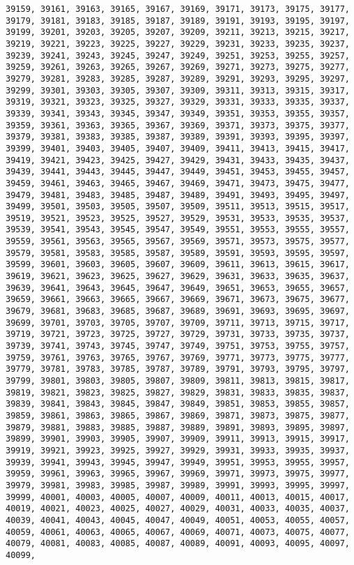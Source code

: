 \documentclass[11pt]{article}
\begin{document}
\begin{Verbatim}[commandchars=\\\{\}]
39159, 39161, 39163, 39165, 39167, 39169, 39171, 39173, 39175, 39177, 39179, 39181, 39183, 39185, 39187, 39189, 39191, 39193, 39195, 39197, 39199, 39201, 39203, 39205, 39207, 39209, 39211, 39213, 39215, 39217, 39219, 39221, 39223, 39225, 39227, 39229, 39231, 39233, 39235, 39237, 39239, 39241, 39243, 39245, 39247, 39249, 39251, 39253, 39255, 39257, 39259, 39261, 39263, 39265, 39267, 39269, 39271, 39273, 39275, 39277, 39279, 39281, 39283, 39285, 39287, 39289, 39291, 39293, 39295, 39297, 39299, 39301, 39303, 39305, 39307, 39309, 39311, 39313, 39315, 39317, 39319, 39321, 39323, 39325, 39327, 39329, 39331, 39333, 39335, 39337, 39339, 39341, 39343, 39345, 39347, 39349, 39351, 39353, 39355, 39357, 39359, 39361, 39363, 39365, 39367, 39369, 39371, 39373, 39375, 39377, 39379, 39381, 39383, 39385, 39387, 39389, 39391, 39393, 39395, 39397, 39399, 39401, 39403, 39405, 39407, 39409, 39411, 39413, 39415, 39417, 39419, 39421, 39423, 39425, 39427, 39429, 39431, 39433, 39435, 39437, 39439, 39441, 39443, 39445, 39447, 39449, 39451, 39453, 39455, 39457, 39459, 39461, 39463, 39465, 39467, 39469, 39471, 39473, 39475, 39477, 39479, 39481, 39483, 39485, 39487, 39489, 39491, 39493, 39495, 39497, 39499, 39501, 39503, 39505, 39507, 39509, 39511, 39513, 39515, 39517, 39519, 39521, 39523, 39525, 39527, 39529, 39531, 39533, 39535, 39537, 39539, 39541, 39543, 39545, 39547, 39549, 39551, 39553, 39555, 39557, 39559, 39561, 39563, 39565, 39567, 39569, 39571, 39573, 39575, 39577, 39579, 39581, 39583, 39585, 39587, 39589, 39591, 39593, 39595, 39597, 39599, 39601, 39603, 39605, 39607, 39609, 39611, 39613, 39615, 39617, 39619, 39621, 39623, 39625, 39627, 39629, 39631, 39633, 39635, 39637, 39639, 39641, 39643, 39645, 39647, 39649, 39651, 39653, 39655, 39657, 39659, 39661, 39663, 39665, 39667, 39669, 39671, 39673, 39675, 39677, 39679, 39681, 39683, 39685, 39687, 39689, 39691, 39693, 39695, 39697, 39699, 39701, 39703, 39705, 39707, 39709, 39711, 39713, 39715, 39717, 39719, 39721, 39723, 39725, 39727, 39729, 39731, 39733, 39735, 39737, 39739, 39741, 39743, 39745, 39747, 39749, 39751, 39753, 39755, 39757, 39759, 39761, 39763, 39765, 39767, 39769, 39771, 39773, 39775, 39777, 39779, 39781, 39783, 39785, 39787, 39789, 39791, 39793, 39795, 39797, 39799, 39801, 39803, 39805, 39807, 39809, 39811, 39813, 39815, 39817, 39819, 39821, 39823, 39825, 39827, 39829, 39831, 39833, 39835, 39837, 39839, 39841, 39843, 39845, 39847, 39849, 39851, 39853, 39855, 39857, 39859, 39861, 39863, 39865, 39867, 39869, 39871, 39873, 39875, 39877, 39879, 39881, 39883, 39885, 39887, 39889, 39891, 39893, 39895, 39897, 39899, 39901, 39903, 39905, 39907, 39909, 39911, 39913, 39915, 39917, 39919, 39921, 39923, 39925, 39927, 39929, 39931, 39933, 39935, 39937, 39939, 39941, 39943, 39945, 39947, 39949, 39951, 39953, 39955, 39957, 39959, 39961, 39963, 39965, 39967, 39969, 39971, 39973, 39975, 39977, 39979, 39981, 39983, 39985, 39987, 39989, 39991, 39993, 39995, 39997, 39999, 40001, 40003, 40005, 40007, 40009, 40011, 40013, 40015, 40017, 40019, 40021, 40023, 40025, 40027, 40029, 40031, 40033, 40035, 40037, 40039, 40041, 40043, 40045, 40047, 40049, 40051, 40053, 40055, 40057, 40059, 40061, 40063, 40065, 40067, 40069, 40071, 40073, 40075, 40077, 40079, 40081, 40083, 40085, 40087, 40089, 40091, 40093, 40095, 40097, 40099, 
\end{Verbatim}
\end{document}
